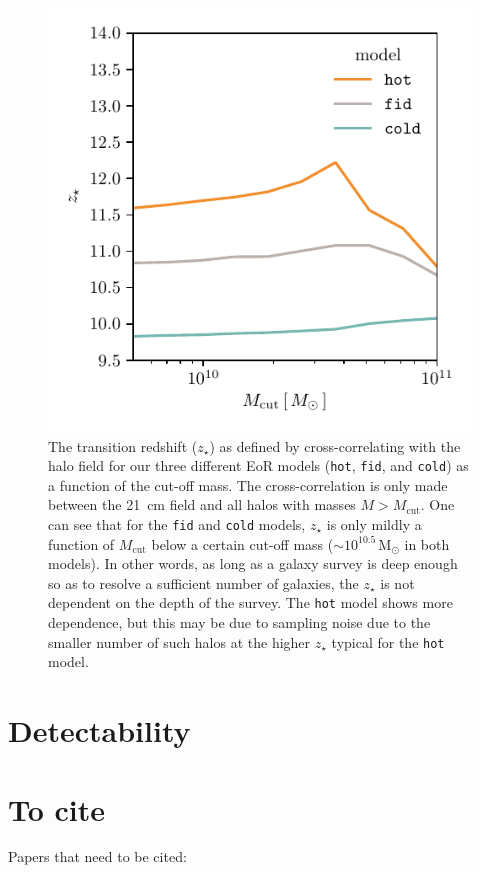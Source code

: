 \documentclass[a4paper,fleqn,usenatbib]{mnras}
\newcommand{\Msun}{\ensuremath{\text{M}_\odot}}
\newcommand{\fid}{\texttt{fid}}
\newcommand{\hot}{\texttt{hot}}
\newcommand{\cold}{\texttt{cold}}
\newcommand{\zst}{\ensuremath{z_{\star}}}
\begin{document}
\begin{figure}
\includegraphics[width=\columnwidth]{plots/ztran_vs_Mcut.pdf}
\caption{The transition redshift (\zst) as defined by cross-correlating with the halo field for our three different EoR models (\hot{}, \fid{}, and
\cold{}) as a function of the cut-off mass. The cross-correlation is only made
between the 21~cm field and all halos with masses $M>M_{\text{cut}}$. One can
see that for the \fid{} and \cold{} models, \zst{} is only mildly a function
of $M_{\text{cut}}$ below a certain cut-off mass ($\sim10^{10.5}\,\Msun$ in
both models). In other words, as long as a galaxy survey is deep enough so as
to resolve a sufficient number of galaxies, the \zst{} is not dependent on the
depth of the survey. The \hot{} model shows more dependence, but this may be
due to sampling noise due to the smaller number of such halos at the higher
\zst{} typical for the \hot{} model.}
\end{figure}


\section{Detectability}


\section{To cite}
Papers that need to be cited:
\end{document}
